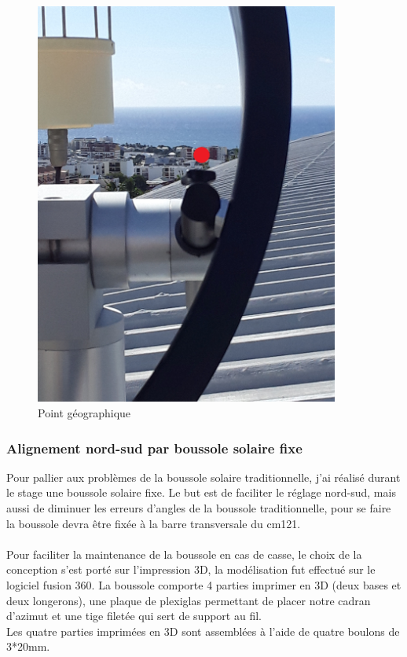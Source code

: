 \documentclass[12pt,a4paper]{article}
\begin{document}
\begin{flushleft}
\begin{figure}[H]
\centering
\includegraphics[width=10cm]{image/montage/6.jpg} 
\caption{Point géographique}
\end{figure}

\subsubsection{Alignement nord-sud par boussole solaire fixe}   

Pour pallier aux problèmes de la boussole solaire traditionnelle, j'ai réalisé durant le stage une boussole solaire fixe. Le but est de faciliter le réglage nord-sud, mais aussi de diminuer les erreurs d'angles de la boussole traditionnelle, pour se faire la boussole devra être fixée à la barre transversale du cm121.\\
~\\
Pour faciliter la maintenance de la boussole en cas de casse, le choix de la conception s'est porté sur l'impression 3D, la modélisation fut effectué sur le logiciel fusion 360. La boussole comporte 4 parties imprimer en 3D (deux bases et deux longerons), une plaque de plexiglas permettant de placer notre cadran d'azimut et une tige filetée qui sert de support au fil.\\

Les quatre parties imprimées en 3D sont assemblées à l'aide de quatre boulons de 3*20mm.\\


\end{flushleft}
\end{document}

